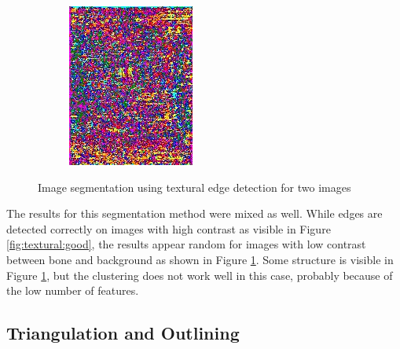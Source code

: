 \documentclass[pdftex,12pt,a4paper]{report}
\begin{document}
\begin{figure}[h]
\begin{subfigure}[b]{0.24\textwidth}
		\subcaption{}
		\label{fig:textural:bad}
	\end{subfigure}
	\begin{subfigure}[b]{0.24\textwidth}
		\centering
		\includegraphics[width=.9\linewidth]{img/segmentation/bad/textural-edges/segmented.jpg}
		\subcaption*{}
		\label{}
	\end{subfigure}
	\caption{Image segmentation using textural edge detection for two images}
	\label{fig:textural}
\end{figure}

The results for this segmentation method were mixed as well. While edges are detected correctly on images with high contrast as visible in Figure \ref{fig:textural:good}, the results appear random for images with low contrast between bone and background as shown in Figure \ref{fig:textural:bad}. Some structure is visible in Figure \ref{fig:textural:bad}, but the clustering does not work well in this case, probably because of the low number of features.

\subsection{Triangulation and Outlining}
\end{document}
